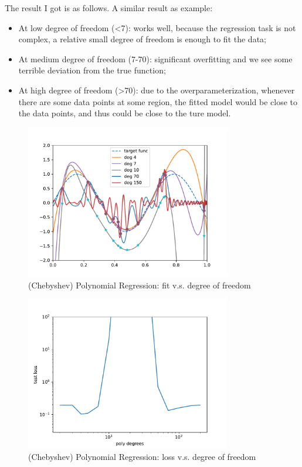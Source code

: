 \documentclass[11pt,a4paper]{ctexart}
\numberwithin{equation}{section}%
\begin{document}
The result I got is as follows. A similar result as example:
\begin{itemize}[topsep=2pt,itemsep=0pt]
    \item At low degree of freedom (<7): works well, because the regression task is not complex, a relative small degree of freedom is enough to fit the data;
    \item At medium degree of freedom (7-70): significant overfitting and we see some terrible deviation from the true function;
    \item At high degree of freedom (>70): due to the overparameterization, whenever there are some data points at some region, the fitted model would be close to the data points, and thus could be close to the ture model.
\end{itemize}

    


\begin{figure}[H]
    \centering
    \includegraphics[width=0.8\textwidth]{output.pdf}
    \caption{(Chebyshev) Polynomial Regression: fit v.s. degree of freedom}
\end{figure}

\begin{figure}[H]
    \centering
    \includegraphics[width=0.8\textwidth]{output_loss.pdf}
    \caption{(Chebyshev) Polynomial Regression: loss v.s. degree of freedom}
\end{figure}
\end{document}
